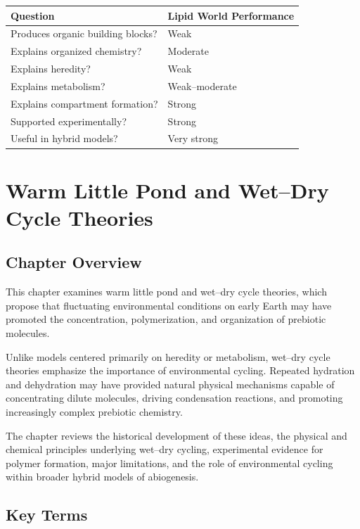 \documentclass[
  oneside]{book}
\begin{document}
\begin{longtable}[]{@{}ll@{}}
\toprule\noalign{}
Question & Lipid World Performance \\
\midrule\noalign{}
\endhead
\bottomrule\noalign{}
\endlastfoot
Produces organic building blocks? & Weak \\
Explains organized chemistry? & Moderate \\
Explains heredity? & Weak \\
Explains metabolism? & Weak--moderate \\
Explains compartment formation? & Strong \\
Supported experimentally? & Strong \\
Useful in hybrid models? & Very strong \\
\end{longtable}

\chapter{Warm Little Pond and Wet--Dry Cycle Theories}\label{warm-little-pond-and-wetdry-cycle-theories}

\section{Chapter Overview}\label{chapter-overview-4}

This chapter examines warm little pond and wet--dry cycle theories, which propose that fluctuating environmental conditions on early Earth may have promoted the concentration, polymerization, and organization of prebiotic molecules.

Unlike models centered primarily on heredity or metabolism, wet--dry cycle theories emphasize the importance of environmental cycling. Repeated hydration and dehydration may have provided natural physical mechanisms capable of concentrating dilute molecules, driving condensation reactions, and promoting increasingly complex prebiotic chemistry.

The chapter reviews the historical development of these ideas, the physical and chemical principles underlying wet--dry cycling, experimental evidence for polymer formation, major limitations, and the role of environmental cycling within broader hybrid models of abiogenesis.

\section{Key Terms}\label{key-terms-4}
\end{document}
